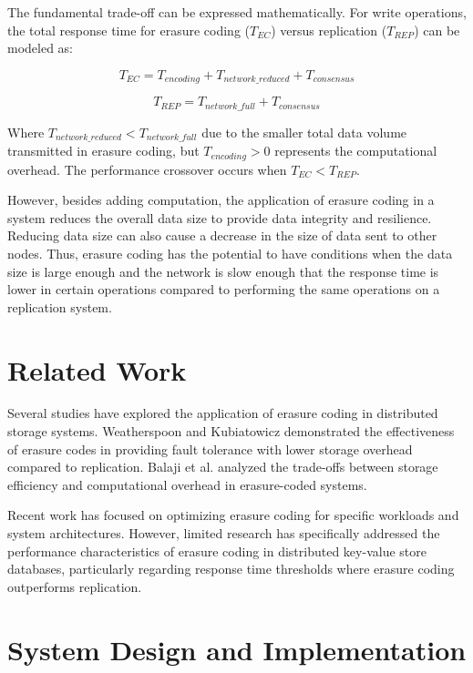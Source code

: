 The fundamental trade-off can be expressed mathematically. For write operations, the total response time for erasure coding ($T_{EC}$) versus replication ($T_{REP}$) can be modeled as:

\begin{equation}
T_{EC} = T_{encoding} + T_{network\_reduced} + T_{consensus}
\end{equation}

\begin{equation}
T_{REP} = T_{network\_full} + T_{consensus}
\end{equation}

Where $T_{network\_reduced} < T_{network\_full}$ due to the smaller total data volume transmitted in erasure coding, but $T_{encoding} > 0$ represents the computational overhead. The performance crossover occurs when $T_{EC} < T_{REP}$.

However, besides adding computation, the application of erasure coding in a system reduces the overall data size to provide data integrity and resilience. Reducing data size can also cause a decrease in the size of data sent to other nodes. Thus, erasure coding has the potential to have conditions when the data size is large enough and the network is slow enough that the response time is lower in certain operations compared to performing the same operations on a replication system.

\section{Related Work}

Several studies have explored the application of erasure coding in distributed storage systems. Weatherspoon and Kubiatowicz \cite{weatherspoon2002erasure} demonstrated the effectiveness of erasure codes in providing fault tolerance with lower storage overhead compared to replication. Balaji et al. \cite{balaji2018erasure} analyzed the trade-offs between storage efficiency and computational overhead in erasure-coded systems.

Recent work has focused on optimizing erasure coding for specific workloads and system architectures. However, limited research has specifically addressed the performance characteristics of erasure coding in distributed key-value store databases, particularly regarding response time thresholds where erasure coding outperforms replication.

\section{System Design and Implementation}

